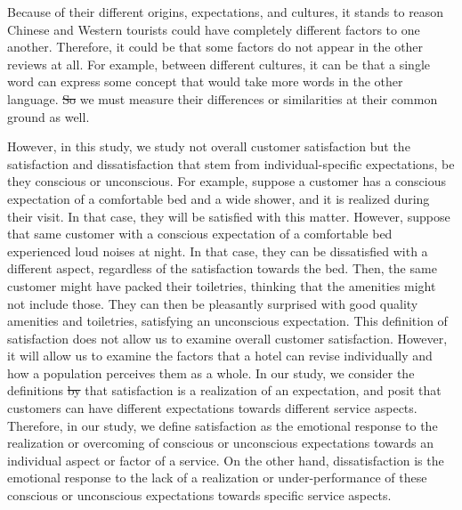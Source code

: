 \documentclass[smallextended,natbib]{svjour3}       %
\providecommand{\DIFadd}[1]{{\protect\color{blue}\uwave{#1}}} %
\providecommand{\DIFdel}[1]{{\protect\color{red}\sout{#1}}}                      %
\providecommand{\DIFaddbegin}{} %
\providecommand{\DIFaddend}{} %
\providecommand{\DIFdelbegin}{} %
\providecommand{\DIFdelend}{} %
\newcommand{\DIFscaledelfig}{0.5}
\newlength{\DIFdelgraphicswidth} %
\newlength{\DIFdelgraphicsheight} %
\newcommand{\DIFaddincludegraphics}[2][]{{\color{blue}\fbox{\DIFOincludegraphics[#1]{#2}}}} %
\newcommand{\DIFdelincludegraphics}[2][]{%
\sbox{\DIFdelgraphicsbox}{\DIFOincludegraphics[#1]{#2}}%
\settoboxwidth{\DIFdelgraphicswidth}{\DIFdelgraphicsbox} %
\settoboxtotalheight{\DIFdelgraphicsheight}{\DIFdelgraphicsbox} %
\scalebox{\DIFscaledelfig}{%
\parbox[b]{\DIFdelgraphicswidth}{\usebox{\DIFdelgraphicsbox}\\[-\baselineskip] \rule{\DIFdelgraphicswidth}{0em}}\llap{\resizebox{\DIFdelgraphicswidth}{\DIFdelgraphicsheight}{%
\setlength{\unitlength}{\DIFdelgraphicswidth}%
\begin{picture}(1,1)%
\thicklines\linethickness{2pt} %
{\color[rgb]{1,0,0}\put(0,0){\framebox(1,1){}}}%
{\color[rgb]{1,0,0}\put(0,0){\line( 1,1){1}}}%
{\color[rgb]{1,0,0}\put(0,1){\line(1,-1){1}}}%
\end{picture}%
}\hspace*{3pt}}} %
} %
\DeclareRobustCommand{\DIFaddbegin}{\DIFOaddbegin \let\includegraphics\DIFaddincludegraphics} %
\DeclareRobustCommand{\DIFaddend}{\DIFOaddend \let\includegraphics\DIFOincludegraphics} %
\DeclareRobustCommand{\DIFdelbegin}{\DIFOdelbegin \let\includegraphics\DIFdelincludegraphics} %
\DeclareRobustCommand{\DIFdelend}{\DIFOaddend \let\includegraphics\DIFOincludegraphics} %
\begin{document}
    Because of their different origins, expectations, and cultures, it stands to reason Chinese and Western tourists could have completely different factors to one another. Therefore, it could be that some factors do not appear in the other reviews at all. For example, between different cultures, it can be that a single word can express some concept that would take more words in the other language. \DIFdelbegin \DIFdel{So }\DIFdelend \DIFaddbegin \DIFadd{Therefore, }\DIFaddend we must measure their differences or similarities at their common ground as well.

    However, in this study, we study not overall customer satisfaction but the satisfaction and dissatisfaction that stem from individual-specific expectations, be they conscious or unconscious. For example, suppose a customer has a conscious expectation of a comfortable bed and a wide shower, and it is realized during their visit. In that case, they will be satisfied with this matter. However, suppose that same customer with a conscious expectation of a comfortable bed experienced loud noises at night. In that case, they can be dissatisfied with a different aspect, regardless of the satisfaction towards the bed. Then, the same customer might have packed their toiletries, thinking that the amenities might not include those. They can then be pleasantly surprised with good quality amenities and toiletries, satisfying an unconscious expectation. This definition of satisfaction does not allow us to examine overall customer satisfaction. However, it will allow us to examine the factors that a hotel can revise individually and how a population perceives them as a whole. In our study, we consider the definitions \DIFdelbegin \DIFdel{by }\DIFdelend \DIFaddbegin \DIFadd{in }\DIFaddend \cite{hunt1975} that satisfaction is a realization of an expectation, and \DIFaddbegin \DIFadd{we }\DIFaddend posit that customers can have different expectations towards different service aspects. Therefore, in our study, we define satisfaction as the emotional response to the realization or overcoming of conscious or unconscious expectations towards an individual aspect or factor of a service. On the other hand, dissatisfaction is the emotional response to the lack of a realization or under-performance of these conscious or unconscious expectations towards specific service aspects.
\end{document}
